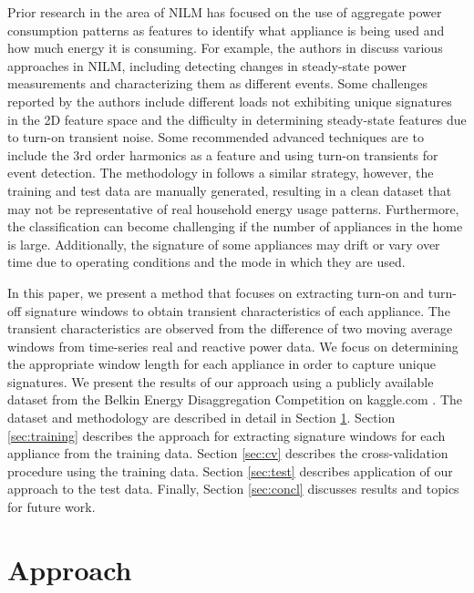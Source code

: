 \documentclass[conference]{IEEEtran}
\begin{document}
Prior research in the area of NILM has focused on the use of aggregate power consumption patterns as features to identify what appliance is being used and how much energy it is consuming. For example, the authors in \cite{mit} discuss various approaches in NILM, including detecting changes in steady-state power measurements and characterizing them as different events. Some challenges reported by the authors include different loads not exhibiting unique signatures in the 2D feature space and the difficulty in determining steady-state features due to turn-on transient noise.  Some recommended advanced techniques are to include the 3rd order harmonics as a feature and using turn-on transients for event detection.  The methodology in \cite{adaptive, EMI, prob, Hart, Shaw, Lin, Chang, Wave} follows a similar strategy, however, the training and test data are manually generated, resulting in a clean dataset that may not be representative of real household energy usage patterns.  Furthermore, the classification can become challenging if the number of appliances in the home is large. Additionally, the signature of some appliances may drift or vary over time due to operating conditions and the mode in which they are used. 

In this paper, we present a method that focuses on extracting turn-on and turn-off signature windows to obtain transient characteristics of each appliance.  The transient characteristics are observed from the difference of two moving average windows from time-series real and reactive power data.  We focus on determining the appropriate window length for each appliance in order to capture unique signatures.  We present the results of our approach using a publicly available dataset from the Belkin Energy Disaggregation Competition on kaggle.com \cite{Kaggle}. The dataset and methodology are described in detail in Section \ref{sec:dataMethod}.  Section \ref{sec:training} describes the approach for extracting signature windows for each appliance from the training data. Section \ref{sec:cv} describes the cross-validation procedure using the training data.  Section \ref{sec:test} describes application of our approach to the test data.  Finally, Section \ref{sec:concl} discusses results and topics for future work.

\section{Approach}\label{sec:dataMethod}
\end{document}
